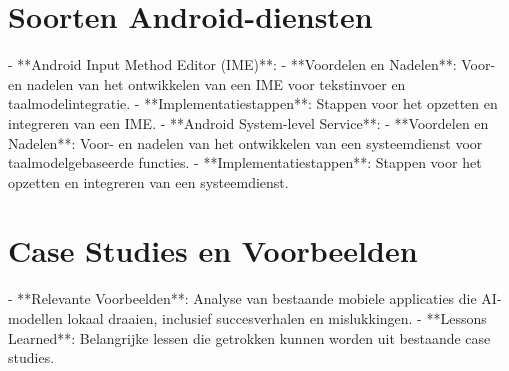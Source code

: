 \section{Soorten Android-diensten}

- **Android Input Method Editor (IME)**:
- **Voordelen en Nadelen**: Voor- en nadelen van het ontwikkelen van een IME voor tekstinvoer en taalmodelintegratie.
- **Implementatiestappen**: Stappen voor het opzetten en integreren van een IME.
- **Android System-level Service**:
- **Voordelen en Nadelen**: Voor- en nadelen van het ontwikkelen van een systeemdienst voor taalmodelgebaseerde functies.
- **Implementatiestappen**: Stappen voor het opzetten en integreren van een systeemdienst.

\section{Case Studies en Voorbeelden}

- **Relevante Voorbeelden**: Analyse van bestaande mobiele applicaties die AI-modellen lokaal draaien, inclusief succesverhalen en mislukkingen.
- **Lessons Learned**: Belangrijke lessen die getrokken kunnen worden uit bestaande case studies.
